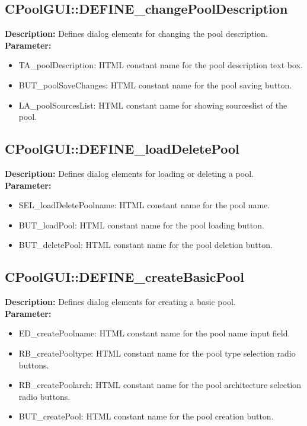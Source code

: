 \subsection{CPoolGUI::DEFINE\_changePoolDescription}
\textbf{Description:} Defines dialog elements for changing the pool description.\\
\textbf{Parameter:}
\begin{itemize}
\item TA\_poolDescription: HTML constant name for the pool description text box.
\item BUT\_poolSaveChanges: HTML constant name for the pool saving button.
\item LA\_poolSourcesList: HTML constant name for showing sourceslist of the pool.
\end{itemize}

\subsection{CPoolGUI::DEFINE\_loadDeletePool}
\textbf{Description:} Defines dialog elements for loading or deleting a pool.\\
\textbf{Parameter:}
\begin{itemize}
\item SEL\_loadDeletePoolname: HTML constant name for the pool name.
\item BUT\_loadPool: HTML constant name for the pool loading button.
\item BUT\_deletePool: HTML constant name for the pool deletion button.
\end{itemize}

\subsection{CPoolGUI::DEFINE\_createBasicPool}
\textbf{Description:} Defines dialog elements for creating a basic pool.\\
\textbf{Parameter:}
\begin{itemize}
\item ED\_createPoolname: HTML constant name for the pool name input field.
\item RB\_createPooltype: HTML constant name for the pool type selection radio buttons.
\item RB\_createPoolarch: HTML constant name for the pool architecture selection radio buttons.
\item BUT\_createPool: HTML constant name for the pool creation button.
\end{itemize}

